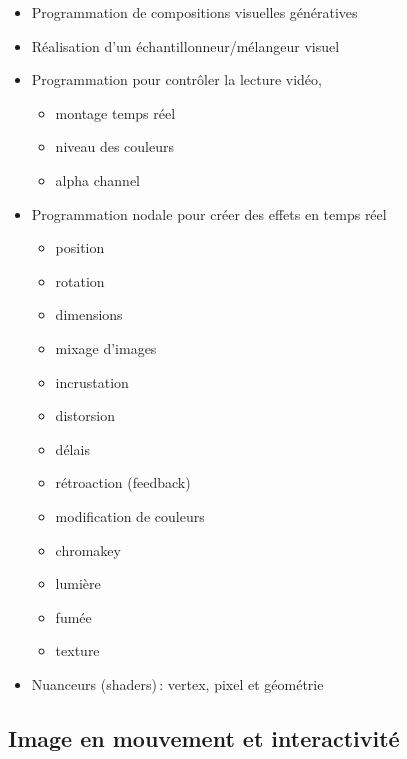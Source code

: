 \documentclass[
]{book}
\providecommand{\tightlist}{%
  \setlength{\itemsep}{0pt}\setlength{\parskip}{0pt}}
\begin{document}
\begin{itemize}
\tightlist
\item
  Programmation de compositions visuelles génératives
\item
  Réalisation d'un échantillonneur/mélangeur visuel
\item
  Programmation pour contrôler la lecture vidéo,

  \begin{itemize}
  \tightlist
  \item
    montage temps réel
  \item
    niveau des couleurs
  \item
    alpha channel\\
  \end{itemize}
\item
  Programmation nodale pour créer des effets en temps réel

  \begin{itemize}
  \tightlist
  \item
    position
  \item
    rotation
  \item
    dimensions
  \item
    mixage d'images
  \item
    incrustation
  \item
    distorsion
  \item
    délais
  \item
    rétroaction (feedback)
  \item
    modification de couleurs
  \item
    chromakey
  \item
    lumière
  \item
    fumée
  \item
    texture
  \end{itemize}
\item
  Nuanceurs (shaders)\,: vertex, pixel et géométrie
\end{itemize}

\hypertarget{image-en-mouvement-et-interactivituxe9}{%
\subsection{Image en mouvement et interactivité}\label{image-en-mouvement-et-interactivituxe9}}
\end{document}
